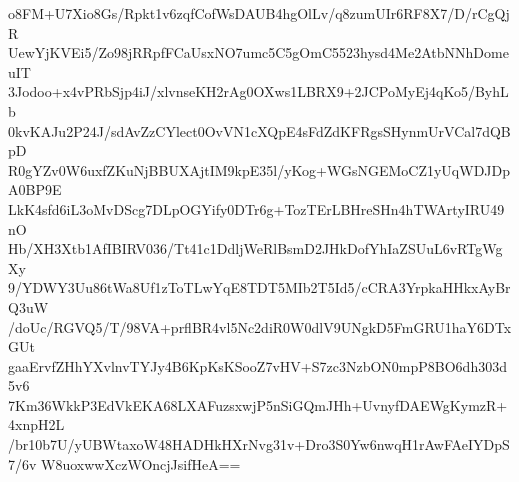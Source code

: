 o8FM+U7Xio8Gs/Rpkt1v6zqfCofWsDAUB4hgOlLv/q8zumUIr6RF8X7/D/rCgQjR
UewYjKVEi5/Zo98jRRpfFCaUsxNO7umc5C5gOmC5523hysd4Me2AtbNNhDomeuIT
3Jodoo+x4vPRbSjp4iJ/xlvnseKH2rAg0OXws1LBRX9+2JCPoMyEj4qKo5/ByhLb
0kvKAJu2P24J/sdAvZzCYlect0OvVN1cXQpE4sFdZdKFRgsSHynmUrVCal7dQBpD
R0gYZv0W6uxfZKuNjBBUXAjtIM9kpE35l/yKog+WGsNGEMoCZ1yUqWDJDpA0BP9E
LkK4sfd6iL3oMvDScg7DLpOGYify0DTr6g+TozTErLBHreSHn4hTWArtyIRU49nO
Hb/XH3Xtb1AfIBIRV036/Tt41c1DdljWeRlBsmD2JHkDofYhIaZSUuL6vRTgWgXy
9/YDWY3Uu86tWa8Uf1zToTLwYqE8TDT5MIb2T5Id5/cCRA3YrpkaHHkxAyBrQ3uW
/doUc/RGVQ5/T/98VA+prflBR4vl5Nc2diR0W0dlV9UNgkD5FmGRU1haY6DTxGUt
gaaErvfZHhYXvlnvTYJy4B6KpKsKSooZ7vHV+S7zc3NzbON0mpP8BO6dh303d5v6
7Km36WkkP3EdVkEKA68LXAFuzsxwjP5nSiGQmJHh+UvnyfDAEWgKymzR+4xnpH2L
/br10b7U/yUBWtaxoW48HADHkHXrNvg31v+Dro3S0Yw6nwqH1rAwFAeIYDpS7/6v
W8uoxwwXczWOncjJsifHeA==
